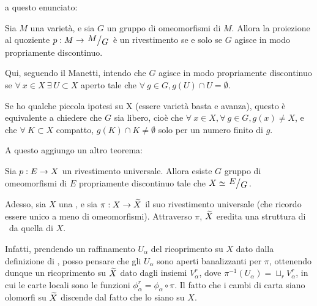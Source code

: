 
 a questo enunciato:
\begin{teorema}
	Sia $M$ una varietà, e sia $G$ un gruppo di omeomorfismi di $M$.
 	Allora la proiezione al quoziente $p:M\rar \quotient{M}{G}$ è un rivestimento se e solo se $G$ agisce in modo propriamente discontinuo.
\end{teorema}

Qui, seguendo il Manetti, intendo che $G$ agisce in modo propriamente discontinuo se $\forall\ x\in X\ \exists\ U\subset X$ aperto tale che $\forall\ g\in G, g(U)\cap U=\emptyset$. 

Se ho qualche piccola ipotesi su X (essere varietà basta e avanza), questo è equivalente a chiedere che $G$ sia libero, cioè che $\forall\ x \in X, \forall\ g\in G, g(x)\neq X$, e che $\forall\ K \subset X$ compatto, $g(K)\cap K \neq \emptyset$ solo per un numero finito di $g$.

A questo aggiungo un altro teorema:

\begin{teorema} \label{rivuniv}
 	Sia $p:E\rightarrow X$ un rivestimento universale. Allora esiste $G$ gruppo di omeomorfismi di $E$ propriamente discontinuo tale che $X\isom\quotient{E}{G}$.
\end{teorema}

Adesso, sia $X$ una \sdR, e sia $\pi:X\rightarrow\widetilde{X}$ il suo rivestimento universale (che ricordo essere unico a meno di omeomorfismi). Attraverso $\pi$, $\widetilde{X}$ eredita una struttura di \sdR\ da quella di $X$.

Infatti, prendendo un raffinamento $U_\alpha$ del ricoprimento su $X$ dato dalla definizione di \sdR, posso pensare che gli $U_\alpha$ sono aperti banalizzanti per $\pi$, ottenendo dunque un ricoprimento su $\widetilde{X}$ dato dagli insiemi $V_\alpha^r$, dove $\pi^{-1}(U_\alpha)=\sqcup_r V_\alpha^r$, in cui le carte locali sono le funzioni $\phi_\alpha^r=\phi_\alpha\circ\pi$. Il fatto che i cambi di carta siano olomorfi su $\widetilde{X}$ discende dal fatto che lo siano su $X$.

